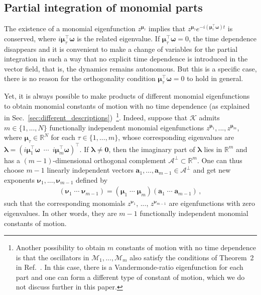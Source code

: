 \documentclass[aps,pre,reprint,longbibliography,superscriptaddress,noshowpacs,floatfix]{revtex4-2}
\theoremstyle{definition}
\theoremstyle{remark}
\begin{document}
\subsection{Partial integration of monomial parts}
\label{subsec:partial_integration_monomial}
The existence of a monomial eigenfunction $z^{\bm \mu_{\tau}}$ implies that $z^{\bm{\mu}_{\tau}}e^{-i(\bm{\mu}_{\tau}^\top \bm{\omega})t}$ is conserved, where $i\bm{\mu}_{\tau}^\top \bm{\omega}$ is the related eigenvalue. If $\bm{\mu}_{\tau}^\top\bm\omega = 0$, the time dependence disappears and it is convenient to make a change of variables for the partial integration in such a way that no explicit time dependence is introduced in the vector field, that is, the dynamics remains autonomous.
But this is a specific case, there is no reason for the orthogonality condition $\bm{\mu}_\tau^\top\bm\omega = 0$ to hold in general. 

Yet, it is always possible to make products of different monomial eigenfunctions to obtain monomial constants of motion with no time dependence (as explained in Sec.~\ref{sec:different_descriptions})~\footnote{Another possibility to obtain $m$ constants of motion with no time dependence is that the oscillators in $\mathcal{M}_1,...,\mathcal{M}_m$ also satisfy the conditions of Theorem~2 in Ref.~\cite{Thibeault2026}. In this case, there is a Vandermonde-ratio eigenfunction for each part and one can form a different type of constant of motion, which we do not discuss further in this paper.}. Indeed, suppose that $\mathcal{K}$ admits $m \in \{1,...,N\}$ functionally independent monomial eigenfunctions $z^{\bm\mu_1}, ...,z^{\bm\mu_m}$, where $\bm{\mu}_{\tau}\in\mathbb{R}^N$ for each $\tau\in \{1,...,m\}$, whose corresponding eigenvalues are $\bm \lambda = (i\bm\mu_1^\top \bm{\omega}\,\,\, \cdots\,\,\, i\bm\mu_m^\top \bm{\omega})^\top$. If $\bm\lambda \neq \bm 0$, then the imaginary part of $\bm\lambda$ lies in $\mathbb{R}^m$
and has a $(m - 1)$-dimensional orthogonal complement $\mathscr{A}^\perp\subset \mathbb{R}^m$. One can thus choose $m-1$
linearly independent vectors $\bm a_1,\ldots,\bm a_{m-1}\in \mathscr{A}^\perp$ and get new exponents $\bm{\nu}_{1}, ..., \bm{\nu}_{m-1}$ defined by
\begin{align}\label{eq:nu}
    (\bm{\nu}_{1} \; \cdots \; \bm{\nu}_{m-1}) = (\bm{\mu}_{1} \; \cdots \; \bm{\mu}_{m}) (\bm{a}_{1} \; \cdots \; \bm{a}_{m-1})\,,
\end{align}
such that the corresponding monomials $z^{\bm\nu_1}$, ..., $z^{\bm\nu_{m-1}}$ are eigenfunctions with zero eigenvalues. In other words, they are $m-1$ functionally independent monomial constants of motion.
\end{document}
